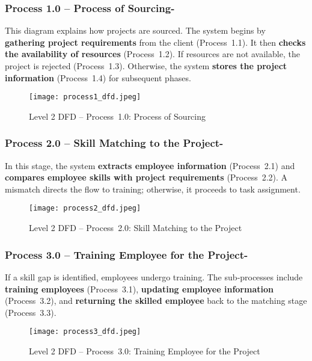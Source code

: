 \documentclass[12pt,a4paper]{article}
\begin{document}
\subsubsection*{Process 1.0 – Process of Sourcing-}
\noindent
This diagram explains how projects are sourced.  The system begins by \textbf{gathering project requirements} from the client (Process 1.1).  It then \textbf{checks the availability of resources} (Process 1.2).  If resources are not available, the project is rejected (Process 1.3).  Otherwise, the system \textbf{stores the project information} (Process 1.4) for subsequent phases.

\begin{figure}[H]
    \centering
    \texttt{[image: process1\_dfd.jpeg]}
    \caption{Level 2 DFD – Process 1.0: Process of Sourcing}
    \label{fig:level2_process1}
\end{figure}

\subsubsection*{Process 2.0 – Skill Matching to the Project-}
\noindent
In this stage, the system \textbf{extracts employee information} (Process 2.1) and \textbf{compares employee skills with project requirements} (Process 2.2).  A mismatch directs the flow to training; otherwise, it proceeds to task assignment.

\begin{figure}[H]
    \centering
    \texttt{[image: process2\_dfd.jpeg]}
    \caption{Level 2 DFD – Process 2.0: Skill Matching to the Project}
    \label{fig:level2_process2}
\end{figure}

\subsubsection*{Process 3.0 – Training Employee for the Project-}
\noindent
If a skill gap is identified, employees undergo training.  The sub‑processes include \textbf{training employees} (Process 3.1), \textbf{updating employee information} (Process 3.2), and \textbf{returning the skilled employee} back to the matching stage (Process 3.3).

\begin{figure}[H]
    \centering
    \texttt{[image: process3\_dfd.jpeg]}
    \caption{Level 2 DFD – Process 3.0: Training Employee for the Project}
    \label{fig:level2_process3}
\end{figure}
\end{document}
